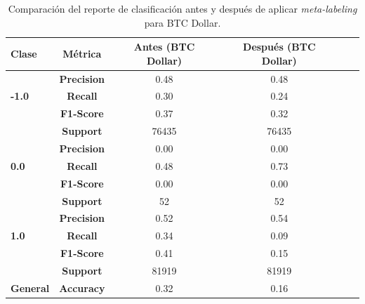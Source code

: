 \documentclass[a4paper,12pt, twoside]{report}
\begin{document}
\begin{table}[h!]
    \centering
    \begin{tabular}{lccccc}
    \hline
    \textbf{Clase} & \textbf{Métrica} & \textbf{Antes (BTC Dollar)} & \textbf{Después (BTC Dollar)} \\
    \hline
    \multirow{3}{*}{\textbf{-1.0}} & \textbf{Precision} & 0.48 & 0.48 \\
                                   & \textbf{Recall}    & 0.30 & 0.24 \\
                                   & \textbf{F1-Score}  & 0.37 & 0.32 \\
                                   & \textbf{Support}   & 76435 & 76435 \\
    \hline
    \multirow{3}{*}{\textbf{0.0}} & \textbf{Precision}  & 0.00 & 0.00 \\
                                  & \textbf{Recall}     & 0.48 & 0.73 \\
                                  & \textbf{F1-Score}   & 0.00 & 0.00 \\
                                  & \textbf{Support}    & 52 & 52 \\
    \hline
    \multirow{3}{*}{\textbf{1.0}} & \textbf{Precision}  & 0.52 & 0.54 \\
                                  & \textbf{Recall}     & 0.34 & 0.09 \\
                                  & \textbf{F1-Score}   & 0.41 & 0.15 \\
                                  & \textbf{Support}    & 81919 & 81919 \\
    \hline
    \textbf{General} & \textbf{Accuracy} & 0.32 & 0.16 \\
    \hline
    \end{tabular}
    \caption{Comparación del reporte de clasificación antes y después de aplicar \textit{meta-labeling} para BTC Dollar.}
    \label{tab:classification_report_btc_dollar}
\end{table}
\end{document}
